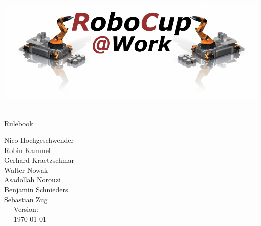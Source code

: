 \begin{titlepage}
  \begin{center}
    {
      
      \includegraphics[width=\textwidth]{images/logo_RoboCupAtWork.pdf}\\[1.23ex]
    }
    \vspace{2.7 cm}
    \hrulefill\par
    {%
      \vspace*{.27cm}
      \Huge{\RCAW}\\[1.23ex]
      \Large Rulebook \\[2ex]
    }
    



    \hrulefill\par
    
    \vfill

    
	Nico Hochgeschwender\\
	Robin Kammel\\
	Gerhard Kraetzschmar\\
	Walter Nowak\\
	Asadollah Norouzi\\
	Benjamin Schnieders\\
	Sebastian Zug\\
    
    \vfill
    ~~ Version: \YEAR ~~ \\
    ~~  \today ~~ \\
  \end{center}
\end{titlepage}
